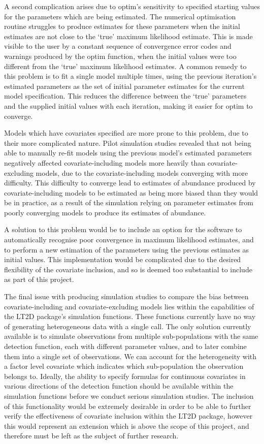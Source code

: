 \documentclass[11pt]{article}
\begin{document}
\begin{multicols}{2}
A second complication arises due to optim's sensitivity to specified starting values for the parameters which are being estimated. The numerical optimisation routine struggles to produce estimates for these parameters when the initial estimates are not close to the `true' maximum likelihood estimate. This is made visible to the user by a constant sequence of convergence error codes and warnings produced by the optim function, when the initial values were too different from the `true' maximum likelihood estimates. A common remedy to this problem is to fit a single model multiple times, using the previous iteration's estimated parameters as the set of initial parameter estimates for the current model specification. This reduces the difference between the `true' parameters and the supplied initial values with each iteration, making it easier for optim to converge.

Models which have covariates specified are more prone to this problem, due to their more complicated nature. Pilot simulation studies revealed that not being able to manually re-fit models using the previous model's estimated parameters negatively affected covariate-including models more heavily than covariate-excluding models, due to the covariate-including models converging with more difficulty. This difficulty to converge lead to estimates of abundance produced by covariate-including models to be estimated as being more biased than they would be in practice, as a result of the simulation relying on parameter estimates from poorly converging models to produce its estimates of abundance.

A solution to this problem would be to include an option for the software to automatically recognise poor convergence in maximum likelihood estimates, and to perform a new estimation of the parameters using the previous estimates as initial values. This implementation would be complicated due to the desired flexibility of the covariate inclusion, and so is deemed too substantial to include as part of this project.

The final issue with producing simulation studies to compare the bias between covariate-including and covariate-excluding models lies within the capabilities of the LT2D package's simulation functions. These functions currently have no way of generating heterogeneous data with a single call. The only solution currently available is to simulate observations from multiple sub-populations with the same detection function, each with different parameter values, and to later combine them into a single set of observations. We can account for the heterogeneity with a factor level covariate which indicates which sub-population the observation belongs to. Ideally, the ability to specify formulas for continuous covariates in various directions of the detection function should be available within the simulation functions before we conduct serious simulation studies. The inclusion of this functionality would be extremely desirable in order to be able to further verify the effectiveness of covariate inclusion within the LT2D package, however this would represent an extension which is above the scope of this project, and therefore must be left as the subject of further research. 



\end{multicols}
\end{document}
